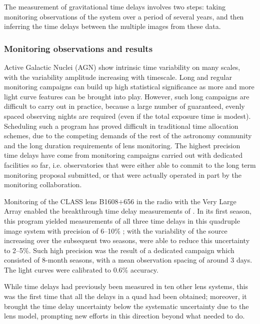 The measurement of gravitational time delays involves two steps:  taking
monitoring observations of the system over a period of several years,
and then inferring the time delays between the multiple images from
these data.


\subsubsection{Monitoring observations and results}

Active Galactic Nuclei (AGN) show intrinsic time variability on many
scales, with the variability amplitude increasing with timescale. Long
and regular
monitoring campaigns can build up high statistical significance as
more and more light curve features can be brought into play.  However,
such long campaigns are difficult to carry out in practice, because a
large number of
guaranteed, evenly spaced
observing nights are required (even if the
total exposure time is modest). Scheduling such a program has proved
difficult in traditional time allocation schemes, due to the competing
demands of the rest of the astronomy community and the long duration
requirements of lens monitoring. The highest precision time delays
have come from monitoring campaigns carried out with dedicated
facilities so far, i.e. observatories that were either able to commit
to the long term monitoring proposal submitted, or that were actually
operated in part by the monitoring collaboration.


Monitoring of the CLASS lens B1608$+$656 in the radio with the Very
Large Array enabled the breakthrough  time delay measurements of
\citep{Fas++02}. In its first season, this program  yielded measurements
of all three time delays in this quadruple image system with precision
of 6--10\% \citep{Fas++99}; with the variability of the source
increasing over the subsequent two seasons, \citep{Fas++02} were able
to reduce this uncertainty to 2--5\%. Such high precision was the
result of a dedicated campaign which consisted of 8-month seasons,
with a mean observation spacing of around 3 days. The light curves
were calibrated to 0.6\% accuracy.

While time delays had previously been measured in ten other lens
systems, this was the first time that all the delays in a quad had
been obtained; moreover, it brought the time delay uncertainty below
the systematic uncertainty due to the lens model, prompting new
efforts in this direction beyond what \citet{K+F99} needed to do.

